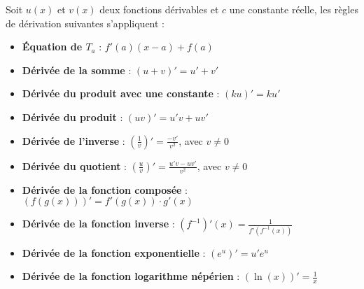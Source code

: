 \documentclass{report}
\begin{document}
    Soit \( u(x) \) et \( v(x) \) deux fonctions dérivables et \( c \) une constante réelle, les règles de dérivation suivantes s'appliquent :
    \iffalse
      \begin{itemize}
        \item \textbf{Équation de $T_a$} : $f'(a)(x-a)+f(a)$
        \item \textbf{Dérivée de la somme} : \( (u + v)' = u' + v' \)
        \item \textbf{Dérivée du produit avec une constante} : \( (ku)' = ku' \)
        \item \textbf{Dérivée du produit} : \( (uv)' = u'v + uv' \)
        \item \textbf{Dérivée de l'inverse} : \(\displaystyle \left(\frac{1}{v}\right)' = \frac{-v'}{v^2} \), avec \( v \neq 0 \)
        \item \textbf{Dérivée du quotient} : \(\displaystyle \left(\frac{u}{v}\right)' = \frac{u'v - uv'}{v^2} \), avec \( v \neq 0 \)
        \item \textbf{Dérivée de la fonction composée} : \(\displaystyle (f(g(x)))' = f'(g(x)) \cdot g'(x) \)
        \item \textbf{Dérivée de la fonction inverse} : \(\displaystyle (f^{-1})'(x) = \frac{1}{f'(f^{-1}(x))} \)
        \item \textbf{Dérivée de la fonction exponentielle} : \( (e^{u})' = u' e^{u} \)
        \item \textbf{Dérivée de la fonction logarithme népérien} : \( (\ln(x))' = \frac{1}{x} \)
      \end{itemize}
\end{document}
